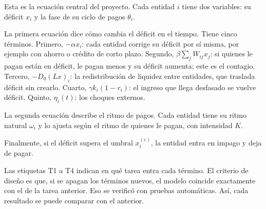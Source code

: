 \begin{decir}
Esta es la ecuación central del proyecto. Cada entidad $i$ tiene dos variables: su
déficit $x_i$ y la fase de su ciclo de pagos $\theta_i$.

La primera ecuación dice cómo cambia el déficit en el tiempo. Tiene cinco términos.
Primero, $-\alpha x_i$: cada entidad corrige su déficit por sí misma, por ejemplo con
ahorro o crédito de corto plazo. Segundo, $\beta\sum_j W_{ij}x_j$: si quienes le pagan
están en déficit, le pagan menos y su déficit aumenta; este es el contagio. Tercero,
$-D_0(Lx)_i$: la redistribución de liquidez entre entidades, que traslada déficit sin
crearlo. Cuarto, $\gamma k_i(1-r_i)$: el ingreso que llega desfasado se vuelve déficit.
Quinto, $\eta_i(t)$: los choques externos.

La segunda ecuación describe el ritmo de pagos. Cada entidad tiene su ritmo natural
$\omega_i$ y lo ajusta según el ritmo de quienes le pagan, con intensidad $K$.

Finalmente, si el déficit supera el umbral $x_i^{(c)}$, la entidad entra en impago y deja
de pagar.

Las etiquetas T1 a T4 indican en qué tarea entra cada término. El criterio de diseño es
que, si se apagan los términos nuevos, el modelo coincide exactamente con el de la tarea
anterior. Eso se verificó con pruebas automáticas. Así, cada resultado se puede
comparar con el anterior.
\end{decir}
